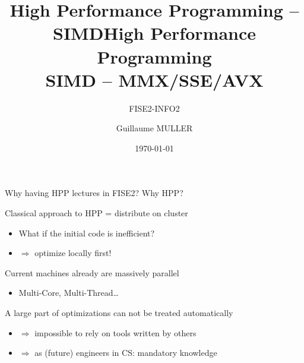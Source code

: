 \documentclass[presentation]{beamer}
\author{Guillaume MULLER}
\date{\today}
\title{High Performance Programming -- SIMD}
\title[HPP -- SIMD]{High Performance Programming\\SIMD -- MMX/SSE/AVX}
\subtitle{FISE2-INFO2}
\begin{document}
\maketitle

\section*{}
\label{sec:orgdeabeb3}

\begin{frame}[label={sec:orgf83580f}]{Why having HPP lectures in FISE2? Why HPP?}
\pause
\begin{block}{Classical approach to HPP = distribute on cluster}
\begin{itemize}
\item What if the initial code is inefficient?
\item \(\Rightarrow\) optimize locally first!
\end{itemize}
\pause
\end{block}
\begin{block}{Current machines already are massively parallel}
\begin{itemize}
\item Multi-Core, Multi-Thread\ldots{}
\end{itemize}
\pause
\end{block}
\begin{block}{A large part of optimizations can not be treated automatically}
\begin{itemize}
\item \(\Rightarrow\) impossible to rely on tools written by others
\item \(\Rightarrow\) as (future) engineers in CS: mandatory knowledge
\end{itemize}
\end{block}
\end{frame}
\end{document}
